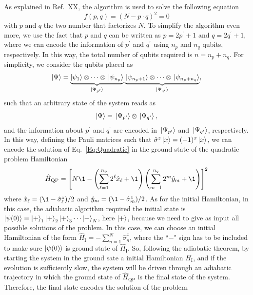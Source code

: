 As explained in Ref.~XX, the algorithm is used to solve the following equation
\begin{equation}
	f(p,q) = (N - p \cdot q)^2 = 0 \label{Eq:Quadratic}
\end{equation}
with $p$ and $q$ the two number that factorizes $N$. To simplify the algorithm even more, we use the fact that $p$ and $q$ can be written as $p = 2p^\prime + 1$ and $q = 2q^\prime + 1$, where we can encode the information of $p^\prime$ and $q^\prime$ using $n_p$ and $n_q$ qubits, respectively. In this way, the total number of qubits required is $n = n_p +n_q$. For simplicity, we consider the qubits placed as
\begin{equation}
	\ket{\Psi} = \underbrace{\ket{\psi_{1}}\otimes \cdots \otimes \ket*{\psi_{n_p}}}_{\ket*{\Psi_{p^\prime}}} \underbrace{\ket*{\psi_{n_p+1}}\otimes \cdots \otimes \ket*{\psi_{n_p +n_q}}}_{\ket*{\Psi_{q^\prime}}},
\end{equation}
such that an arbitrary state of the system reads as
\begin{equation}
	\ket{\Psi} = \ket*{\Psi_{p^\prime}} \otimes \ket*{\Psi_{q^\prime}} ,
\end{equation}
and the information about $p^\prime$ and $q^\prime$ are encoded in $\ket*{\Psi_{p^\prime}}$ and $\ket*{\Psi_{q^\prime}}$, respectively. In this way, defining the Pauli matrices such that $\hat{\sigma}^{z}\ket{x} = (-1)^{x}\ket{x}$, we can encode the solution of Eq.~\eqref{Eq:Quadratic} in the ground state of the quadratic problem Hamiltonian~\cite{PhysRevA.104.L050403}
\begin{equation}
	\hat{H}_{\mathrm{QP}} = \left[ N\1 - \left(\sum_{\ell=1}^{n_p} 2^{\ell} \hat{x}_{\ell} + \1 \right)\left(\sum_{m=1}^{n_q} 2^{m} \hat{y}_{m} + \1 \right)\right]^2
\end{equation}
where $\hat{x}_{\ell} = (\1 - \hat{\sigma}_{\ell}^{z})/2$ and $\hat{y}_{m} = (\1 - \hat{\sigma}_{m}^{z})/2$. As for the initial Hamiltonian, in this case, the adiabatic algorithm required the initial state is $\ket{\psi(0)} = \ket{+}_{1}\ket{+}_{2}\ket{+}_{3}\cdots \ket{+}_{N}$, here $\ket{+}$, because we need to give as input all possible solutions of the problem. In this case, we can choose an initial Hamiltonian of the form $\hat{H}_{\mathrm{I}} = -\sum_{n=1}^{N} \hat{\sigma}^{x}_{n}$, where the ``$-$" sign has to be included to make sure $\ket{\psi(0)}$ is ground state of $\hat{H}_{\mathrm{I}}$. So, following the adiabatic theorem, by starting the system in the ground sate a initial Hamiltonian $\hat{H}_{\mathrm{I}}$, and if the evolution is sufficiently slow, the system will be driven through an adiabatic trajectory in which the ground state of $\hat{H}_{\mathrm{QP}}$ is the final state of the system. Therefore, the final state encodes the solution of the problem. 

